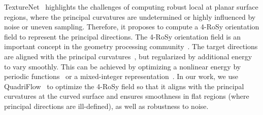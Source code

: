 TextureNet~\cite{huang2018texturenet} highlights the challenges of computing robust local \cframe{} at planar surface regions, where the principal curvatures are undetermined or highly influenced by noise or uneven sampling. Therefore, it proposes to compute a 4-RoSy orientation field to represent the principal directions. The 4-RoSy orientation field is an important concept in the geometry processing community~\cite{ray2008n,lai2010metric}. The target directions are aligned with the principal curvatures~\cite{cohen2003restricted,cazals2005estimating}, but regularized by additional energy to vary smoothly. This can be achieved by optimizing a nonlinear energy by periodic functions~\cite{hertzmann2000illustrating,ray2009geometry} or a mixed-integer representation~\cite{ray2008n,bommes2009mixed}. In our work, we use QuadriFlow~\cite{huang2018quadriflow} to optimize the 4-RoSy field so that it aligns with the principal curvatures at the curved surface and ensures smoothness in flat regions (where principal directions are ill-defined), as well as robustness to noise.
